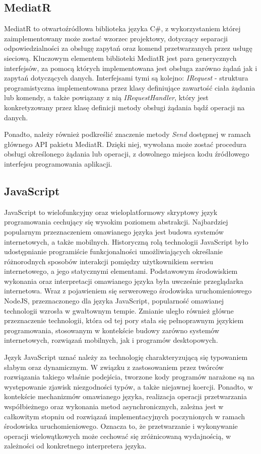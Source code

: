 \subsection*{MediatR}
MediatR to otwartoźródłowa biblioteka języka C\#, z wykorzystaniem której zaimplementowany może zostać wzorzec projektowy, dotyczący separacji odpowiedzialności za obsługę zapytań oraz komend przetwarzanych przez usługę sieciową. Kluczowym elementem biblioteki MediatR jest para generycznych interfejsów, za pomocą których implementowana jest obsługa zarówno żądań jak i zapytań dotyczących danych. Interfejsami tymi są kolejno: \textit{IRequest} - struktura programistyczna implementowana przez klasy definiujące zawartość ciała żądania lub komendy, a także powiązany z nią \textit{IRequestHandler}, który jest konkretyzowany przez klasę definicji metody obsługi żądania bądź operacji na danych. 

Ponadto, należy również podkreślić znaczenie metody \textit{Send} dostępnej w ramach głównego API pakietu MediatR. Dzięki niej, wywołana może zostać procedura obsługi określonego żądania lub operacji, z dowolnego miejsca kodu źródłowego interfejsu programowania aplikacji.
\subsection*{JavaScript}
JavaScript to wielofunkcyjny oraz wieloplatformowy skryptowy język programowania cechujący się wysokim poziomem abstrakcji. Najbardziej popularnym przeznaczeniem omawianego języka jest budowa systemów internetowych, a także mobilnych. Historyczną rolą technologii JavaScript było udostępnianie programiście funkcjonalności umożliwiających określanie różnorodnych sposobów interakcji pomiędzy użytkownikiem serwisu internetowego, a jego statycznymi elementami. Podstawowym środowiskiem wykonania oraz interpretacji omawianego języka była uwcześnie przeglądarka internetowa. Wraz z pojawieniem się serwerowego środowiska uruchomieniowego NodeJS, przeznaczonego dla języka JavaScript, popularność omawianej technologii wzrosła w gwałtownym tempie. Zmianie uległo również główne przeznaczenie technologii, która od tej pory stała się pełnoprawnym językiem programowania, stosowanym w kontekście budowy zarówno systemów internetowych, rozwiązań mobilnych, jak i programów desktopowych.

Język JavaScript uznać należy za technologię charakteryzującą się typowaniem słabym oraz dynamicznym. W związku z zastosowaniem przez twórców rozwiązania takiego właśnie podejścia, tworzone kody programów narażone są na występowanie zjawisk niezgodności typów, a także niejawnej koercji. Ponadto, w kontekście mechanizmów omawianego języka, realizacja operacji przetwarzania współbieżnego oraz wykonania metod asynchronicznych, zależna jest w całkowitym stopniu od rozwiązań implementacyjnych poczynionych w ramach środowiska uruchomieniowego. Oznacza to, że przetwarzanie i wykonywanie operacji wielowątkowych może cechować się zróżnicowaną wydajnością, w zależności od konkretnego interpretera języka.  

